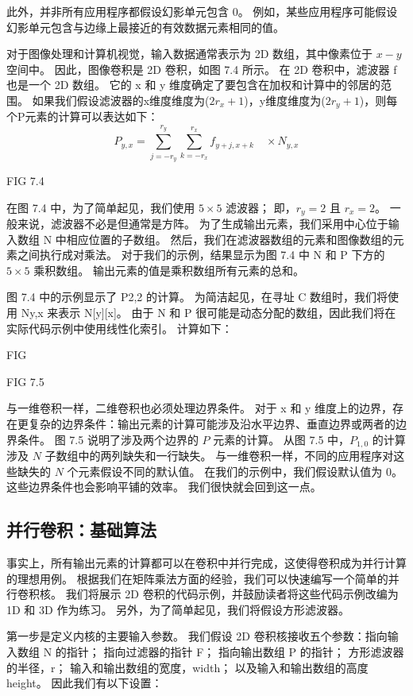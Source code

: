 此外，并非所有应用程序都假设幻影单元包含 0。
例如，某些应用程序可能假设幻影单元包含与边缘上最接近的有效数据元素相同的值。

对于图像处理和计算机视觉，输入数据通常表示为 2D 数组，其中像素位于 $x-y$ 空间中。 
因此，图像卷积是 2D 卷积，如图 7.4 所示。 在 2D 卷积中，滤波器 f 也是一个 2D 数组。 
它的 x 和 y 维度确定了要包含在加权和计算中的邻居的范围。 
如果我们假设滤波器的x维度维度为($2r_x + 1$)，y维度维度为($2r_y + 1$)，则每个P元素的计算可以表达如下：
$$
P_{y, x}=\sum_{j=-r_{y}}^{r_{y}} \sum_{k=-r_{x}}^{r_{x}} f_{y+j, x+k} \quad \times N_{y, x}
$$

{\color{red} FIG 7.4}

在图 7.4 中，为了简单起见，我们使用 $5 \times 5$ 滤波器； 即，$r_y = 2$ 且 $r_x = 2$。
一般来说，滤波器不必是但通常是方阵。 为了生成输出元素，我们采用中心位于输入数组 N 中相应位置的子数组。
然后，我们在滤波器数组的元素和图像数组的元素之间执行成对乘法。 
对于我们的示例，结果显示为图 7.4 中 N 和 P 下方的 $5 \times 5$ 乘积数组。 输出元素的值是乘积数组所有元素的总和。

图 7.4 中的示例显示了 P2,2 的计算。 为简洁起见，在寻址 C 数组时，我们将使用 Ny,x 来表示 N[y][x]。 
由于 N 和 P 很可能是动态分配的数组，因此我们将在实际代码示例中使用线性化索引。 计算如下：

{\color{red} FIG}

{\color{red} FIG 7.5}

与一维卷积一样，二维卷积也必须处理边界条件。 
对于 x 和 y 维度上的边界，存在更复杂的边界条件：输出元素的计算可能涉及沿水平边界、垂直边界或两者的边界条件。 
图 7.5 说明了涉及两个边界的 $P$ 元素的计算。 从图 7.5 中，$P_{1,0}$ 的计算涉及 $N$ 子数组中的两列缺失和一行缺失。
与一维卷积一样，不同的应用程序对这些缺失的 $N$ 个元素假设不同的默认值。 
在我们的示例中，我们假设默认值为 0。这些边界条件也会影响平铺的效率。 我们很快就会回到这一点。

\subsection{并行卷积：基础算法}
事实上，所有输出元素的计算都可以在卷积中并行完成，这使得卷积成为并行计算的理想用例。 
根据我们在矩阵乘法方面的经验，我们可以快速编写一个简单的并行卷积核。 
我们将展示 2D 卷积的代码示例，并鼓励读者将这些代码示例改编为 1D 和 3D 作为练习。 
另外，为了简单起见，我们将假设方形滤波器。

第一步是定义内核的主要输入参数。 我们假设 2D 卷积核接收五个参数：指向输入数组 N 的指针； 指向过滤器的指针 F； 
指向输出数组 P 的指针； 方形滤波器的半径，r； 输入和输出数组的宽度，width； 以及输入和输出数组的高度 height。 
因此我们有以下设置：

